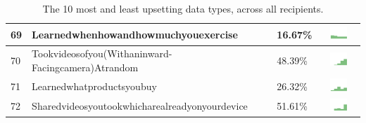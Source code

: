 \begin{table}[t]
\begin{center}
\begin{tabular}{| p{0.5cm} | p{7cm} | p{1cm} | c |}
69 & Learnedwhenhowandhowmuchyouexercise & 16.67\% & \includegraphics[width = 2cm, height = 0.5cm]{../learnedwhenhowandhowmuchyouexerciseAPPSERVER} \\ \hline 
70 & Tookvideosofyou(Withaninward-Facingcamera)Atrandom & 48.39\% & \includegraphics[width = 2cm, height = 0.5cm]{../tookvideosofyou(withaninward-facingcamera)atrandomAPPSERVER} \\ \hline 
71 & Learnedwhatproductsyoubuy & 26.32\% & \includegraphics[width = 2cm, height = 0.5cm]{../learnedwhatproductsyoubuyAPPSERVER} \\ \hline 
72 & Sharedvideosyoutookwhicharealreadyonyourdevice & 51.61\% & \includegraphics[width = 2cm, height = 0.5cm]{../sharedvideosyoutookwhicharealreadyonyourdeviceAPPSERVER} \\ \hline 
\hline
\end{tabular}
\caption{The 10 most and least upsetting data types, across all recipients.}
\label{top10}
\end{center}
\end{table}
